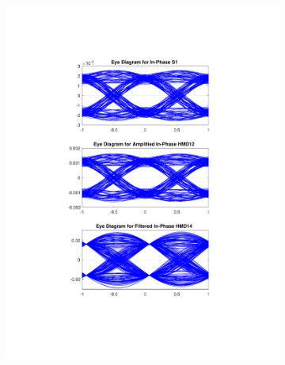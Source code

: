 \begin{figure}[H]
	\centering
	\begin{subfigure}{.45\textwidth}
		\centering
		\includegraphics[clip, trim=5cm 4cm 5cm 4cm,
			width=\textwidth]{./sdf/m_qam_system/figures/eyes/if_nn_p_60_03.pdf}
	\end{subfigure}
	\begin{subfigure}{.45\textwidth}
		\centering

\end{subfigure}
\end{figure}

